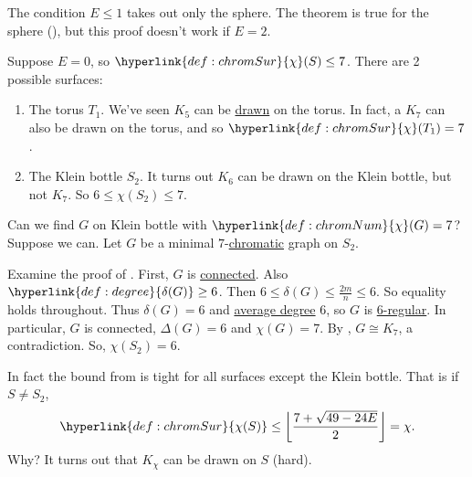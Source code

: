 \documentclass{article}
\DeclarePairedDelimiter\floor{\lfloor}{\rfloor}
\begin{document}
\begin{remark}
    The condition $E \leq 1$ takes out only the sphere.
    The theorem is true for the sphere (), but this proof doesn't work if $E = 2$.
\end{remark}

\begin{eg}
    Suppose $E = 0$, so $\hyperlink{def:chromSur}{\chi}(S) \leq 7$. There are 2 possible surfaces:
    \begin{enumerate}[label=(\roman*)]
        \item The torus $T_1$. We've seen \hyperlink{def:Kn}{$K_5$} can be \hyperlink{def:drawing}{drawn} on the torus.
            In fact, a $K_7$ can also be drawn on the torus, and so $\hyperlink{def:chromSur}{\chi}(T_1) = 7$.
        \item The Klein bottle $S_2$. It turns out $K_6$ can be drawn on the Klein bottle, but not $K_7$.
            So $6 \leq \chi(S_2) \leq 7$.
    \end{enumerate}
\end{eg}
Can we find $G$ on Klein bottle with $\hyperlink{def:chromNum}{\chi}(G) = 7$?
Suppose we can. Let $G$ be a minimal $7$-\hyperlink{def:chromNum}{chromatic} graph on $S_2$.

Examine the proof of . First, $G$ is \hyperlink{def:components}{connected}. Also $\hyperlink{def:degree}{\delta(G)} \geq 6$.
Then $6 \leq \delta(G) \leq \frac{2m}{n} \leq 6$.
So equality holds throughout. Thus $\delta(G) = 6$ and \hyperlink{def:degree}{average degree} 6, so $G$ is \hyperlink{def:regular}{6-regular}.
In particular, $G$ is connected, $\Delta(G) = 6$ and $\chi(G) = 7$. By , $G \cong K_7$, a contradiction.
So, $\chi(S_2) = 6.$

In fact the bound from  is tight for all surfaces except the Klein bottle.
That is if $S \neq S_2$,
\begin{equation*}
    \hyperlink{def:chromSur}{\chi(S)} \leq \floor*{\frac{7 + \sqrt{49-24E}}{2}} = \chi.
\end{equation*}
Why? It turns out that $K_\chi$ can be drawn on $S$ (hard).
\end{document}
